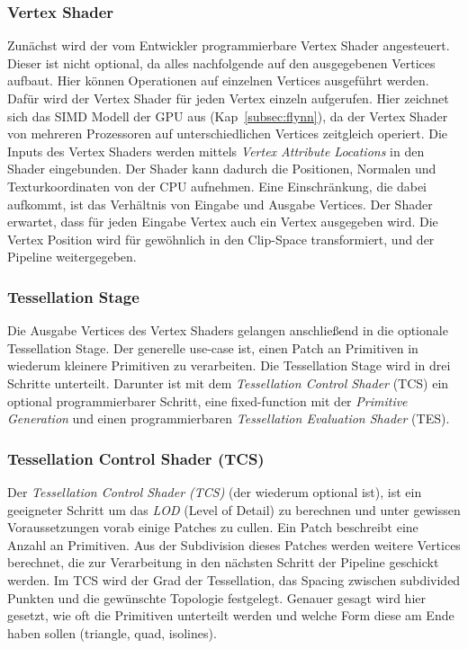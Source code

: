 \subsubsection{Vertex Shader}
\label{subsubsec:vertex}
Zunächst wird der vom Entwickler programmierbare Vertex Shader angesteuert.
Dieser ist nicht optional, da alles nachfolgende auf den ausgegebenen Vertices aufbaut.
Hier können Operationen auf einzelnen Vertices ausgeführt werden.
Dafür wird der Vertex Shader für jeden Vertex einzeln aufgerufen.
Hier zeichnet sich das SIMD Modell der GPU aus (Kap~\ref{subsec:flynn}), da der Vertex Shader von mehreren Prozessoren auf unterschiedlichen Vertices zeitgleich operiert.
Die Inputs des Vertex Shaders werden mittels \textit{Vertex Attribute Locations} in den Shader eingebunden.
Der Shader kann dadurch die Positionen, Normalen und Texturkoordinaten von der CPU aufnehmen.
Eine Einschränkung, die dabei aufkommt, ist das Verhältnis von Eingabe und Ausgabe Vertices.
Der Shader erwartet, dass für jeden Eingabe Vertex auch ein Vertex ausgegeben wird.
Die Vertex Position wird für gewöhnlich in den Clip-Space transformiert, und der Pipeline weitergegeben.

\subsubsection{Tessellation Stage}
\label{subsubsec:tesselation}
Die Ausgabe Vertices des Vertex Shaders gelangen anschließend in die optionale Tessellation Stage.
Der generelle use-case ist, einen Patch an Primitiven in wiederum kleinere Primitiven zu verarbeiten. 
Die Tessellation Stage wird in drei Schritte unterteilt.
Darunter ist mit dem \textit{Tessellation Control Shader} (TCS) ein optional programmierbarer Schritt, eine fixed-function mit der \textit{Primitive Generation} und einen programmierbaren \textit{Tessellation Evaluation Shader} (TES).

\subsubsection*{Tessellation Control Shader (TCS)}
Der \textit{Tessellation Control Shader (TCS)} (der wiederum optional ist), ist ein geeigneter Schritt um das \textit{LOD} (Level of Detail) zu berechnen und unter gewissen Voraussetzungen vorab einige Patches zu cullen. 
Ein Patch beschreibt eine Anzahl an Primitiven.
Aus der Subdivision dieses Patches werden weitere Vertices berechnet, die zur Verarbeitung in den nächsten Schritt der Pipeline geschickt werden.
Im TCS wird der Grad der Tessellation, das Spacing zwischen subdivided Punkten und die gewünschte Topologie festgelegt.
Genauer gesagt wird hier gesetzt, wie oft die Primitiven unterteilt werden und welche Form diese am Ende haben sollen (triangle, quad, isolines).

